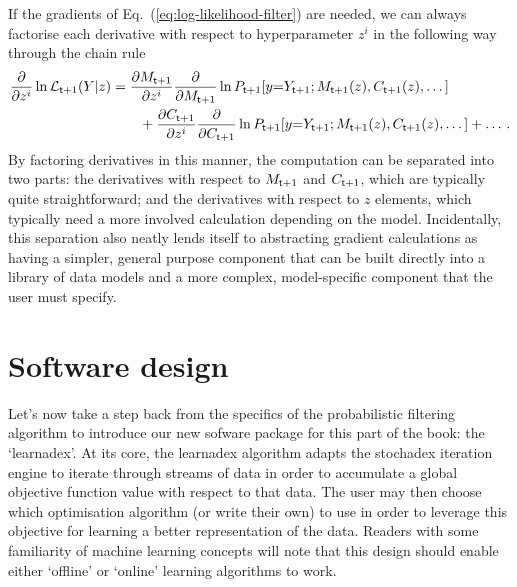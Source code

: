 If the gradients of Eq.~(\ref{eq:log-likelihood-filter}) are needed, we can always factorise each derivative with respect to hyperparameter $z^i$ in the following way through the chain rule
\begin{align}
\frac{\partial}{\partial z^i}\ln {\cal L}_{{\sf t}+1}(Y \vert z) &= \frac{\partial M_{{\sf t}+1}}{\partial z^i}\frac{\partial}{\partial M_{{\sf t}+1}}\ln P_{{\sf t}+1}[y{=}Y_{{\sf t}+1};M_{{\sf t}+1}(z),C_{{\sf t}+1}(z),\dots ] \nonumber \\ 
&\qquad + \frac{\partial C_{{\sf t}+1}}{\partial z^i}\frac{\partial }{\partial C_{{\sf t}+1}}\ln P_{{\sf t}+1}[y{=}Y_{{\sf t}+1};M_{{\sf t}+1}(z),C_{{\sf t}+1}(z),\dots ] + \dots  \,. \label{eq:log-likelihood-filter-grad}
\end{align}
By factoring derivatives in this manner, the computation can be separated into two parts: the derivatives with respect to $M_{{\sf t}+1}$ and $C_{{\sf t}+1}$, which are typically quite straightforward; and the derivatives with respect to $z$ elements, which typically need a more involved calculation depending on the model. Incidentally, this separation also neatly lends itself to abstracting gradient calculations as having a simpler, general purpose component that can be built directly into a library of data models and a more complex, model-specific component that the user must specify.

\section{\sffamily Software design}

Let's now take a step back from the specifics of the probabilistic filtering algorithm to introduce our new sofware package for this part of the book: the `learnadex'. At its core, the learnadex algorithm adapts the stochadex iteration engine to iterate through streams of data in order to accumulate a global objective function value with respect to that data. The user may then choose which optimisation algorithm (or write their own) to use in order to leverage this objective for learning a better representation of the data. Readers with some familiarity of machine learning concepts will note that this design should enable either `offline' or `online' learning algorithms to work.

